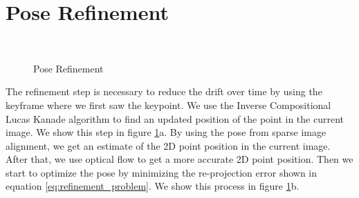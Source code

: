 \documentclass[11pt,a4paper,titlepage,oneside]{report}
\begin{document}
\section{Pose Refinement}\label{sec:refinement}
\begin{figure}[H]
  \centering
  \\
  \caption{Pose Refinement}\label{fig:pose_refinement}
\end{figure}

The refinement step is necessary to reduce the drift over time by using the keyframe where we first saw the keypoint. We use the Inverse Compositional Lucas Kanade algorithm to find an updated position of the point in the current image. We show this step in figure \ref{fig:pose_refinement}a. By using the pose from sparse image alignment, we get an estimate of the 2D point position in the current image. After that, we use optical flow to get a more accurate 2D point position. Then we start to optimize the pose by minimizing the re-projection error shown in equation \ref{eq:refinement_problem}. We show this process in figure \ref{fig:pose_refinement}b.
\end{document}
